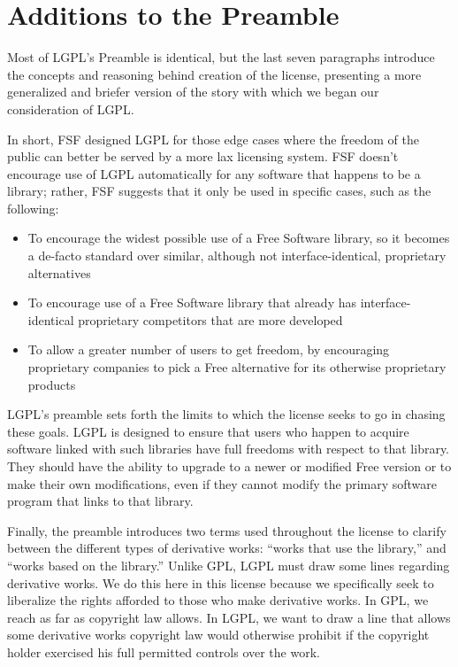 \documentclass[11pt, letterpaper]{book}
\begin{document}
\section{Additions to the Preamble}

Most of LGPL's Preamble is identical, but the last seven paragraphs
introduce the concepts and reasoning behind creation of the license,
presenting a more generalized and briefer version of the story with which
we began our consideration of LGPL\@.

In short, FSF designed LGPL for those edge cases where the freedom of the
public can better be served by a more lax licensing system. FSF doesn't
encourage use of LGPL automatically for any software that happens to be a
library; rather, FSF suggests that it only be used in specific cases, such
as the following:

\begin{itemize}

\item To encourage the widest possible use of a Free Software library, so
  it becomes a de-facto standard over similar, although not
  interface-identical, proprietary alternatives

\item To encourage use of a Free Software library that already has
  interface-identical proprietary competitors that are more developed

\item To allow a greater number of users to get freedom, by encouraging
  proprietary companies to pick a Free alternative for its otherwise
  proprietary products

\end{itemize}

LGPL's preamble sets forth the limits to which the license seeks to go in
chasing these goals. LGPL is designed to ensure that users who happen to
acquire software linked with such libraries have full freedoms with
respect to that library. They should have the ability to upgrade to a newer
or modified Free version or to make their own modifications, even if they
cannot modify the primary software program that links to that library.

Finally, the preamble introduces two terms used throughout the license to
clarify between the different types of derivative works: ``works that use
the library,'' and ``works based on the library.''  Unlike GPL, LGPL must
draw some lines regarding derivative works. We do this here in this
license because we specifically seek to liberalize the rights afforded to
those who make derivative works. In GPL, we reach as far as copyright law
allows. In LGPL, we want to draw a line that allows some derivative works
copyright law would otherwise prohibit if the copyright holder exercised
his full permitted controls over the work.
\end{document}
